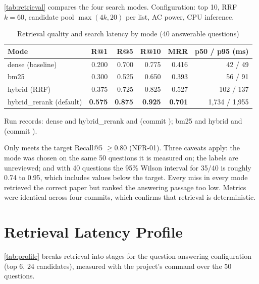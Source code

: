 \autoref{tab:retrieval} compares the four search modes. Configuration: top 10, RRF $k=60$, candidate pool
$\max(4k,20)$ per list, AC power, CPU inference.

\begin{table}[htbp]
  \centering
  \caption{Retrieval quality and search latency by mode (40 answerable questions)}\label{tab:retrieval}
  {\small
  \begin{tabular}{@{}lrrrrr@{}}
    \toprule
    \textbf{Mode} & \textbf{R@1} & \textbf{R@5} & \textbf{R@10} & \textbf{MRR} & \textbf{p50 / p95 (ms)} \\
    \midrule
    dense (baseline) & 0.200 & 0.700 & 0.775 & 0.416 & 42 / 49 \\
    bm25 & 0.300 & 0.525 & 0.650 & 0.393 & 56 / 91 \\
    hybrid (RRF) & 0.375 & 0.725 & 0.825 & 0.527 & 102 / 137 \\
    hybrid\_rerank (default) & \textbf{0.575} & \textbf{0.875} & \textbf{0.925} & \textbf{0.701} & 1{,}734 / 1{,}955 \\
    \bottomrule
  \end{tabular}
  }

  \smallskip
  {\footnotesize Run records: dense and hybrid\_rerank  and 
  (commit ); bm25 and hybrid  and  (commit ).}
\end{table}

Only  meets the target Recall@5 $\geq 0.80$ (NFR-01). Three caveats apply: the mode was chosen
on the same 50 questions it is measured on; the labels are unreviewed; and with 40 questions the 95\% Wilson interval
for 35/40 is roughly 0.74 to 0.95, which includes values below the target. Every miss in every mode retrieved the
correct paper but ranked the answering passage too low. Metrics were identical across four commits, which confirms
that retrieval is deterministic.

\section{Retrieval Latency Profile}

\autoref{tab:profile} breaks retrieval into stages for the question-answering configuration (top 6, 24 candidates),
measured with the project's  command over the 50 questions.

